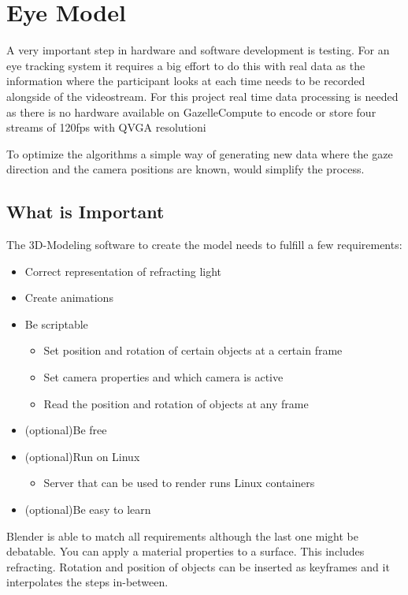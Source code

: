 \chapter{Eye Model}
\label{chap:eyeModel}

A very important step in hardware and software development is testing. For an eye tracking system it requires a big effort to do this with real data as the information where the participant looks at each time needs to be recorded alongside of the videostream. For this project real time data processing is needed as there is no hardware available on GazelleCompute to encode or store four streams of 120fps with QVGA resolutioni

To optimize the algorithms a simple way of generating new data where the gaze direction and the camera positions are known, would simplify the process. 
\section{What is Important}
\label{sec:whatIsImportant}

The 3D-Modeling software to create the model needs to fulfill a few requirements:
\begin{itemize}
	\item Correct representation of refracting light
	\item Create animations 
	\item Be scriptable
	\begin{itemize}
		\item Set position and rotation of certain objects at a certain frame
		\item Set camera properties and which camera is active
		\item Read the position and rotation of objects at any frame
	\end{itemize}
	\item (optional)Be free
	\item (optional)Run on Linux
	\begin{itemize}
		\item Server that can be used to render runs Linux containers
	\end{itemize}
	\item (optional)Be easy to learn
\end{itemize}

Blender is able to match all requirements although the last one might be debatable. You can apply a material properties to a surface. This includes refracting. Rotation and position of objects can be inserted as keyframes and it interpolates the steps in-between. 

